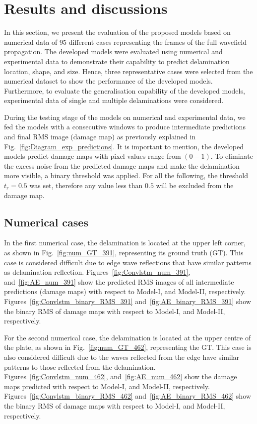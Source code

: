 \section{Results and discussions}
\begin{sloppypar}
	In this section, we present the evaluation of the proposed models based on numerical data of \(95\) different cases representing the frames of the full wavefield propagation. 
	The developed models were evaluated using numerical and experimental data to demonstrate their capability to predict delamination location, shape, and size.	
	Hence, three representative cases were selected from the numerical dataset to show the performance of the developed models.
	Furthermore, to evaluate the generalisation capability of the developed models, experimental data of single and multiple delaminations were considered.
	
	During the testing stage of the models on numerical and experimental data, we fed the models with a consecutive windows to produce intermediate predictions and final RMS image (damage map) as previously explained in Fig.~\ref{fig:Diagram_exp_predictions}.
	It is important to mention, the developed models predict damage maps with pixel values range from \((0-1)\).
	To eliminate the excess noise from the predicted damage maps and make the delamination more visible, a binary threshold was applied.
	For all the following, the threshold $t_r=0.5$ was set, therefore any value less than $0.5$ will be excluded from the damage map.
	
	\subsection{Numerical cases}
	In the first numerical case, the delamination is located at the upper left corner, as shown in Fig.~\ref{fig:num_GT_391}, representing its ground truth (GT).
	This case is considered difficult due to edge wave reflections that have similar patterns as delamination reflection.
	Figures~\ref{fig:Convlstm_num_391}, and~\ref{fig:AE_num_391} show the predicted RMS images of all intermediate predictions (damage maps) with respect to Model-I, and Model-II, respectively.
	Figures~\ref{fig:Convlstm_binary_RMS_391} and~\ref{fig:AE_binary_RMS_391} show the binary RMS of damage maps with respect to Model-I, and Model-II, respectively.
	
	For the second numerical case, the delamination is located at the upper centre of the plate, as shown in Fig.~\ref{fig:num_GT_462}, representing the GT.
	This case is also considered difficult due to the waves reflected from the edge have similar patterns to those reflected from the delamination.
	Figures~\ref{fig:Convlstm_num_462}, and~\ref{fig:AE_num_462} show the damage maps predicted with respect to Model-I, and Model-II, respectively.
	Figures~\ref{fig:Convlstm_binary_RMS_462} and~\ref{fig:AE_binary_RMS_462} show the binary RMS of damage maps with respect to Model-I, and Model-II, respectively.
	

\end{sloppypar}
